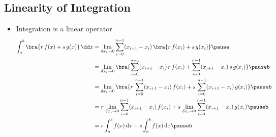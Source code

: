 \begin{slide}
\section[-2]{Linearity of Integration}

\begin{PauseHighLight}
  \begin{itemize}
  \item Integration is a linear operator
    {\small
    \begin{align*}
      \int_a^b \bra{r\,f(x) + s\,g(x)} \, \dd x
      &= \lim\limits_{\delta x_i\rightarrow 0} \sum_{i=0}^{n-1}
                                    (x_{i+1} - x_i) \, \bra{r\,f(x_i)
        + s\,g(x_i)} \pause \\
      &= \lim\limits_{\delta x_i\rightarrow 0} \bra{
        \sum_{i=0}^{n-1} (x_{i+1} - x_i) \, r\,f(x_i)
        + \sum_{i=0}^{n-1} (x_{i+1} - x_i) \, s\,g(x_i)} \pauseb \\
      &= \lim\limits_{\delta x_i\rightarrow 0} \bra{
        r\,\sum_{i=0}^{n-1} (x_{i+1} - x_i) \, f(x_i)
        + s\, \sum_{i=0}^{n-1} (x_{i+1} - x_i) \, g(x_i)} \pauseb \\
        &=  r\, \lim\limits_{\delta x_i\rightarrow 0} \sum_{i=0}^{n-1}
          (x_{i+1} - x_i) \, f(x_i)
          +  s\, \lim\limits_{\delta x_i\rightarrow 0} \sum_{i=0}^{n-1}
          (x_{i+1} - x_i) \, g(x_i) \pauseb \\
      &= r \int_a^b f(x) \, \mathrm{d}x + s \int_a^b f(x) \, \mathrm{d}x\pauseb
    \end{align*}}
  \end{itemize}
\end{PauseHighLight}

\end{slide}


